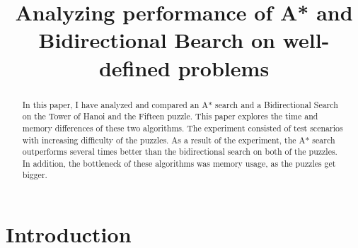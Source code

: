 \documentclass[conference]{IEEEtran}
\begin{document}
%
\title{Analyzing performance of A* and Bidirectional Bearch on well-defined problems}

\author{
}

\maketitle

\begin{abstract}
In this paper, I have analyzed and compared an A* search and a Bidirectional Search on the Tower of Hanoi and the Fifteen puzzle. This paper explores the time and memory differences of these two algorithms. The experiment consisted of test scenarios with increasing difficulty of the puzzles. As a result of the experiment, the A* search outperforms several times better than the bidirectional search on both of the puzzles. In addition, the bottleneck of these algorithms was memory usage, as the puzzles get bigger.
\end{abstract}



%
\IEEEpeerreviewmaketitle

\section{Introduction}
\end{document}
